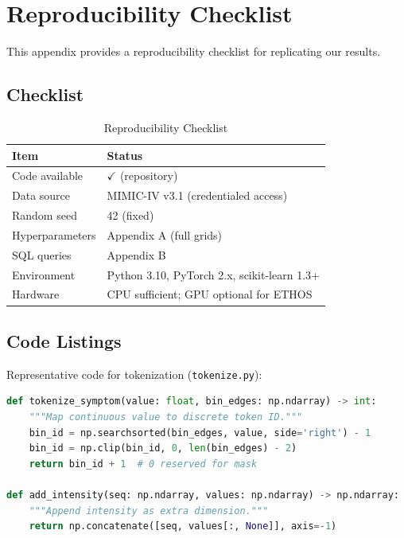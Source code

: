 \chapter{Reproducibility Checklist}
\label{app:repro}

This appendix provides a reproducibility checklist for replicating our results.

\section{Checklist}

\begin{table}[h]
\centering
\caption{Reproducibility Checklist}
\begin{tabular}{ll}
\toprule
Item & Status \\
\midrule
Code available & $\checkmark$ (repository) \\
Data source & MIMIC-IV v3.1 (credentialed access) \\
Random seed & 42 (fixed) \\
Hyperparameters & Appendix A (full grids) \\
SQL queries & Appendix B \\
Environment & Python 3.10, PyTorch 2.x, scikit-learn 1.3+ \\
Hardware & CPU sufficient; GPU optional for ETHOS \\
\bottomrule
\end{tabular}
\label{tab:repro_checklist}
\end{table}

\section{Code Listings}

Representative code for tokenization (\texttt{tokenize.py}):

\begin{lstlisting}[language=Python, caption={Tokenization (excerpt)}]
def tokenize_symptom(value: float, bin_edges: np.ndarray) -> int:
    """Map continuous value to discrete token ID."""
    bin_id = np.searchsorted(bin_edges, value, side='right') - 1
    bin_id = np.clip(bin_id, 0, len(bin_edges) - 2)
    return bin_id + 1  # 0 reserved for mask

def add_intensity(seq: np.ndarray, values: np.ndarray) -> np.ndarray:
    """Append intensity as extra dimension."""
    return np.concatenate([seq, values[:, None]], axis=-1)
\end{lstlisting}

